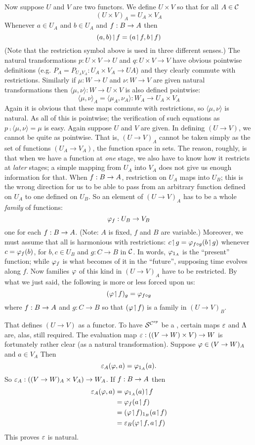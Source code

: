 Now suppose $U$ and $V$ are two functors. We define $U \times V$ so that for all $A \in \mathcal C$
$$
(U \times V)_A = U_A \times V_A
$$
%
Whenever $a \in U_A$ and $b \in U_A$ and $f: B \rightarrow A$ then
$$
(a,b) \!\upharpoonleft\! f = (a \!\upharpoonleft\! f, b \!\upharpoonleft\! f)
$$
(Note that the restriction symbol above is used in three different senses.) The natural transformations $p : U \times V \to U$ and $q: U\times V \to V$ have obvious pointwise definitions  (e.g. $P_A= P_{{U_A}{V_A}} : U_A \times V_A \to UA$) and they clearly commute with restrictions. Similarly if $\mu: W \to U$ and $\nu: W\to V$ are given natural transformations then $\langle \mu, \nu \rangle: W \to U \times V$ is also defined pointwise:
$$
{\langle \mu, \nu \rangle}_A = \langle \mu_A, \nu_A \rangle : W_A \to U_A \times V_A
$$
%
Again it is obvious that these maps commute with restrictions, so ${\langle \mu, \nu \rangle}$ is natural. As all of this is pointwise; the verifi­cation of such equations as $p \comp \langle \mu, \nu \rangle = \mu$ is easy. Again suppose $U$ and $V$ are given. In defining $(U \to V)$, we cannot be quite as pointwise. That is, $(U \to V)_A$ cannot be taken simply as the set of functions $(U_A \to V_A)$, the function space in sets. The reason, roughly, is that when we have a function at {\it one} stage, we also have to know how it restricts at {\it later} stages; a simple mapping from $U_A$ into $V_A$ does not give us enough information for that. When $f : B \rightarrow A$, restriction on
$U_A$ maps into $U_B$; this is the wrong direction for us to be able to pass from an arbitrary function defined on $U_A$ to one defined on $U_B$. So an element of $(U \to V)_A$ has to be a whole {\it family} of functions:
$$
\varphi_f: U_B \rightarrow V_B
$$
%
one for each $f: B \rightarrow A$. (Note: $A$ is fixed, $f$ and $B$ are variable.) Moreover, we must assume that all is harmonious with
restrictions: $c \!\upharpoonleft\! g = \varphi_{f \circ g} (b \!\upharpoonleft\! g)$ whenever $c = \varphi_f(b)$, for $b,c \in U_B$ and $g : C\to B$ in $\mathcal C$. In words, $\varphi_{{\textrm 1}_A}$ is the ``present'' function; while $\varphi_f$ is what becomes of it in the ``future'', sup­posing time evolves along $f$. Now families $\varphi$ of this kind in
$(U\to V)_A$ have to be restricted. By what we just said, the fol­lowing is more or less forced upon us:
$$
(\varphi \!\upharpoonleft\! f)_g = \varphi_{f\circ g}
$$
%
where $f : B \rightarrow A$ and $g: C\to B$ so that $(\varphi \!\upharpoonleft\! f)$ is a family in $(U\to V)_B$. 

That defines $(U\to V)$ as a functor. To have $\mathcal S^{\mathcal C^{op}}$ be a \ccc, certain maps $\varepsilon$ and $\Lambda$ are, alas, still required. The evaluation map $\varepsilon : ((V\rightarrow W) \times V) \rightarrow W$ is fortunately rather clear (as a natural transformation). Suppose $\varphi \in (V \rightarrow W)_A$ and $a \in V_A$ Then
$$
\varepsilon_A(\varphi, a) = \varphi_{{\textrm 1}_A} (a).
$$
%
So $\varepsilon_A : ((V \rightarrow W)_A \times V_A) \rightarrow W_A$. If $f: B \rightarrow A$ then 
\begin{align*}
\ev_A(\ffam, a) &= \ffam_{\id_A}(a) \res f\\
&= \ffam_f(a \res f)\\
&= (\ffam \res f)_{\id_B} (a \res f)\\
&= \ev_B(\ffam \res f, a \res f)
\end{align*}
%
This proves $\varepsilon$ is natural.

